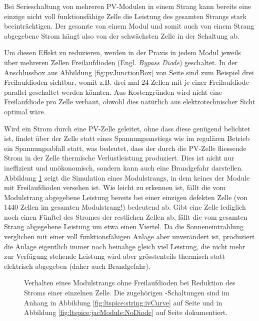 Bei Serieschaltung von  mehreren PV-Modulen in einem Strang  kann bereits eine
einzige nicht voll  funktionsf\"ahige Zelle die Leistung  des gesamten Strangs
stark beeintr\"achtigen.  Der gesamte von einem Modul und somit auch von einem
Strang  abgegebene Strom  h\"angt  also  von der  schw\"achsten  Zelle in  der
Schaltung ab.

Um  diesen  Effekt  zu  reduzieren,  werden  in  der  Praxis  in  jedem  Modul
jeweils  \"uber mehreren  Zellen  Freilaufdioden  (Engl. \emph{Bypass  Diode})
geschaltet. In  der  Anschlussbox  aus Abbildung  \ref{fig:pvJunctionBox}  von
Seite  \pageref{fig:pvJunctionBox}  sind   zum  Beispiel  drei  Freilaufdioden
sichtbar, womit  z.B. drei mal 24  Zellen mit je einer  Freilaufdiode parallel
geschaltet werden k\"onnten. Aus Kostengr\"unden wird nicht eine Freilaufdiode
pro  Zelle  verbaut,  obwohl  dies nat\"urlich  aus  elektrotechnischer  Sicht
optimal w\"are.

\clearpage
Wird   ein   Strom   durch   eine   PV-Zelle   geleitet,   ohne   dass   diese
gen\"ugend   belichtet   ist,   findet    \"uber   der   Zelle   statt   eines
Spannungsanstiegs  wie  im  regul\"aren  Betrieb  ein  Spannungsabfall  statt,
was   bedeutet,   dass   der   durch  die   PV-Zelle   fliessende   Strom   in
der   Zelle  thermische   Verlustleistung  produziert. Dies   ist  nicht   nur
ineffizient   und  un\"okonomisch,   sondern   kann   auch  eine   Brandgefahr
darstellen. Abbildung    \ref{fig:simu:iv-curves:array:generic}   zeigt    die
Simulation eines  Modulstrangs, in  dem keines  der Module  mit Freilaufdioden
versehen  ist. Wie  leicht  zu  erkennen  ist,  f\"allt  die  vom  Modulstrang
abgegebene Leistung bereits bei einer einzigen defekten Zelle (von 1440 Zellen
im gesamten Modulstrang!)  bedeutend ab. Gibt eine Zelle  lediglich noch einen
F\"unftel  des Stromes  der restlichen  Zellen  ab, f\"allt  die vom  gesamten
Strang  abgegebene Leistung  um etwa  einen Viertel. Da  die Sonneneintrahlung
verglichen mit  einer voll  funktionsf\"ahigen Anlage aber  unver\"andert ist,
produziert die Anlage eigentlich immer noch beinahge gleich viel Leistung, die
nicht  mehr  zur  Verf\"ugung  stehende  Leistung  wird  aber  gr\"osstenteils
thermisch statt elektrisch abgegeben (daher auch Brandgefahr).


\begin{figure}[h!tb]
    \centering
    
    \caption[%
        IV- und PV-Kurven eines Modulsstrangs bei Leistungseinbruch,
        keine Freilaufdioden%
    ]
    {%
        Verhalten       eines      Modulstrangs       ohne      Freilaufdioden
        bei     Reduktion     des     Stroms    einer     einzelnen     Zelle.
        Die      zugeh\"origen     -Schaltungen      sind     im
        Anhang       in       Abbildung       \ref{fig:ltspice:string:ivCurve}
        auf     Seite      \pageref{fig:ltspice:string:ivCurve}     und     in
        Abbildung      \ref{fig:ltspice:jacModule:NoDiode}      auf      Seite
        \pageref{fig:ltspice:jacModule:NoDiode} dokumentiert.%
    }
    \label{fig:simu:iv-curves:array:generic}
\end{figure}

